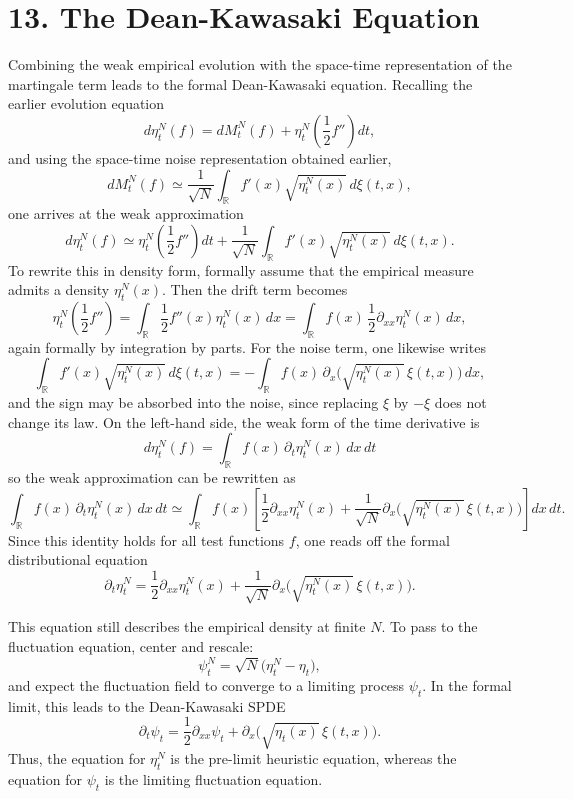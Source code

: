 \documentclass[11pt]{article}
\theoremstyle{definition}
\theoremstyle{remark}
\begin{document}
\section*{13. The Dean-Kawasaki Equation}
Combining the weak empirical evolution with the space-time representation of the martingale term leads to the formal Dean-Kawasaki equation. Recalling the earlier evolution equation
\[
d\eta_t^N(f)=dM_t^N(f)+\eta_t^N\!\left(\frac{1}{2}f''\right)dt,
\]
and using the space-time noise representation obtained earlier,
\[
dM_t^N(f)\simeq \frac{1}{\sqrt{N}}\int_{\mathbb R} f'(x)\sqrt{\eta_t^N(x)}\,d\xi(t,x),
\]
one arrives at the weak approximation
\[
d\eta_t^N(f)\simeq \eta_t^N\!\left(\frac{1}{2}f''\right)dt+\frac{1}{\sqrt{N}}\int_{\mathbb R} f'(x)\sqrt{\eta_t^N(x)}\,d\xi(t,x).
\]
To rewrite this in density form, formally assume that the empirical measure admits a density $\eta_t^N(x)$. Then the drift term becomes
\[
\eta_t^N\!\left(\frac{1}{2}f''\right)=\int_{\mathbb R} \frac{1}{2}f''(x)\eta_t^N(x)\,dx=\int_{\mathbb R} f(x)\,\frac{1}{2}\partial_{xx}\eta_t^N(x)\,dx,
\]
again formally by integration by parts. For the noise term, one likewise writes
\[
\int_{\mathbb R} f'(x)\sqrt{\eta_t^N(x)}\,d\xi(t,x)=-\int_{\mathbb R} f(x)\,\partial_x\bigl(\sqrt{\eta_t^N(x)}\,\xi(t,x)\bigr)\,dx,
\]
and the sign may be absorbed into the noise, since replacing $\xi$ by $-\xi$ does not change its law. On the left-hand side, the weak form of the time derivative is
\[
d\eta_t^N(f)=\int_{\mathbb R} f(x)\,\partial_t\eta_t^N(x)\,dx\,dt
\]
so the weak approximation can be rewritten as
\[
\int_{\mathbb R} f(x)\,\partial_t\eta_t^N(x)\,dx\,dt \simeq \int_{\mathbb R} f(x)\left[\frac{1}{2}\partial_{xx}\eta_t^N(x)+\frac{1}{\sqrt{N}}\partial_x\bigl(\sqrt{\eta_t^N(x)}\,\xi(t,x)\bigr)\right]dx\,dt.
\]
Since this identity holds for all test functions $f$, one reads off the formal distributional equation
\[
\partial_t\eta_t^N=\frac{1}{2}\partial_{xx}\eta_t^N(x)+\frac{1}{\sqrt{N}}\partial_x\bigl(\sqrt{\eta_t^N(x)}\,\xi(t,x)\bigr).
\]

This equation still describes the empirical density at finite $N$. To pass to the fluctuation equation, center and rescale:
\[
\psi_t^N=\sqrt{N}\bigl(\eta_t^N-\eta_t\bigr),
\]
and expect the fluctuation field to converge to a limiting process $\psi_t$. In the formal limit, this leads to the Dean-Kawasaki SPDE
\[
\partial_t\psi_t=\frac{1}{2}\partial_{xx}\psi_t+\partial_x\bigl(\sqrt{\eta_t(x)}\,\xi(t,x)\bigr).
\]
Thus, the equation for $\eta_t^N$ is the pre-limit heuristic equation, whereas the equation for $\psi_t$ is the limiting fluctuation equation.
\end{document}
